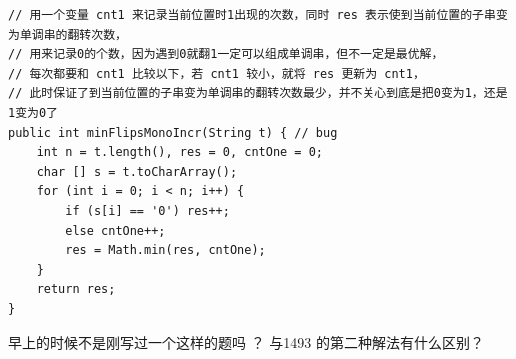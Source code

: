 \documentclass[9pt, b5paaper]{book}
\begin{document}
\begin{enumerate}
\begin{verbatim}
// 用一个变量 cnt1 来记录当前位置时1出现的次数，同时 res 表示使到当前位置的子串变为单调串的翻转次数，
// 用来记录0的个数，因为遇到0就翻1一定可以组成单调串，但不一定是最优解，
// 每次都要和 cnt1 比较以下，若 cnt1 较小，就将 res 更新为 cnt1，
// 此时保证了到当前位置的子串变为单调串的翻转次数最少，并不关心到底是把0变为1，还是1变为0了
public int minFlipsMonoIncr(String t) { // bug
    int n = t.length(), res = 0, cntOne = 0;
    char [] s = t.toCharArray();
    for (int i = 0; i < n; i++) {
        if (s[i] == '0') res++;
        else cntOne++;
        res = Math.min(res, cntOne);
    }
    return res;
}
\end{verbatim}

早上的时候不是刚写过一个这样的题吗 ？ 与1493 的第二种解法有什么区别？
\end{enumerate}
\end{document}
